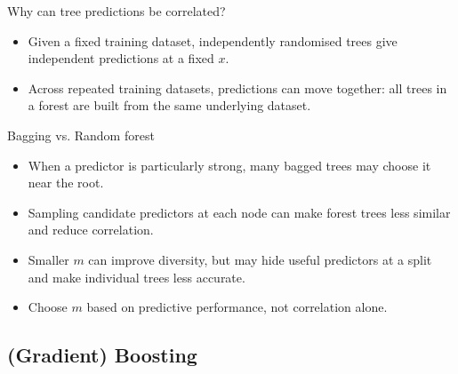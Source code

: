 \documentclass[10pt]{beamer}
\begin{document}
\begin{frame}{Why can tree predictions be correlated?}
\begin{itemize}
\item Given a fixed training dataset, independently randomised trees give independent predictions at a fixed $x$.
\item Across repeated training datasets, predictions can move together: all trees in a forest are built from the same underlying dataset.
\end{itemize}
\end{frame}

\begin{frame}{Bagging vs. Random forest}
\begin{itemize}
\item When a predictor is particularly strong, many bagged trees may choose it near the root.
\pause
\item Sampling candidate predictors at each node can make forest trees less similar and reduce correlation.
\pause
\item Smaller $m$ can improve diversity, but may hide useful predictors at a split and make individual trees less accurate.
\item Choose $m$ based on predictive performance, not correlation alone.
\end{itemize}
\end{frame}


\subsection{(Gradient) Boosting}
\frame{\subsectionpage}

\end{document}
